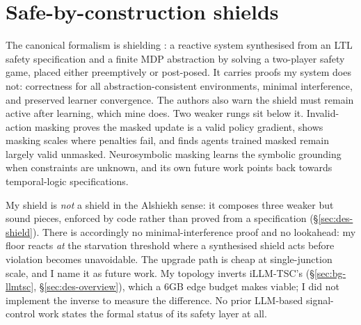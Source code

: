 \section{Safe-by-construction shields}\label{sec:bg-shields}

The canonical formalism is shielding \cite{alshiekh2018shield}: a reactive system synthesised from an LTL safety specification and a finite MDP abstraction by solving a two-player safety game, placed either preemptively or post-posed. It carries proofs my system does not: correctness for all abstraction-consistent environments, minimal interference, and preserved learner convergence. The authors also warn the shield must remain active after learning, which mine does. Two weaker rungs sit below it. Invalid-action masking \cite{huang2020masking} proves the masked update is a valid policy gradient, shows masking scales where penalties fail, and finds agents trained masked remain largely valid unmasked. Neurosymbolic masking \cite{nsam2026} learns the symbolic grounding when constraints are unknown, and its own future work points back towards temporal-logic specifications.

My shield is \emph{not} a shield in the Alshiekh sense: it composes three weaker but sound pieces, enforced by code rather than proved from a specification (\S\ref{sec:des-shield}). There is accordingly no minimal-interference proof and no lookahead: my floor reacts \emph{at} the starvation threshold where a synthesised shield acts before violation becomes unavoidable. The upgrade path is cheap at single-junction scale, and I name it as future work. My topology inverts iLLM-TSC's (\S\ref{sec:bg-llmtsc}, \S\ref{sec:des-overview}), which a 6GB edge budget makes viable; I did not implement the inverse to measure the difference. No prior LLM-based signal-control work states the formal status of its safety layer at all.
